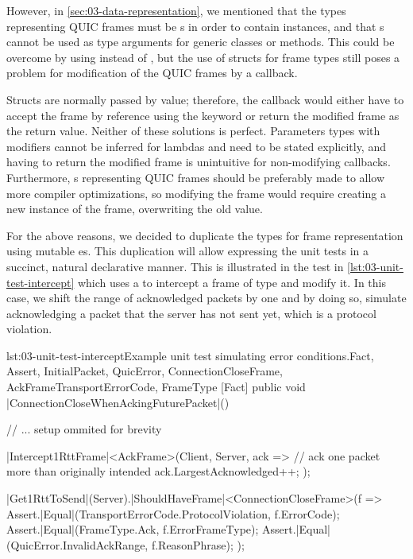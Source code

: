 However, in \autoref{sec:03-data-representation}, we mentioned that the types representing QUIC
frames must be s in order to contain  instances, and that
s cannot be used as type arguments for generic classes or methods. This could be
overcome by using  instead of , but the use of structs for frame
types still poses a problem for modification of the QUIC frames by a callback.

Structs are normally passed by value; therefore, the callback would either have to accept the frame
by reference using the  keyword or return the modified frame as the return value.
Neither of these solutions is perfect. Parameters types with  modifiers cannot be
inferred for lambdas and need to be stated explicitly, and having to return the modified frame is
unintuitive for non-modifying callbacks. Furthermore, s representing QUIC frames
should be preferably made  to allow more compiler optimizations, so modifying the
frame would require creating a new instance of the frame, overwriting the old value.

For the above reasons, we decided to duplicate the types for frame representation using mutable
es. This duplication will allow expressing the unit tests in a succinct, natural
declarative manner. This is illustrated in the test in \autoref{lst:03-unit-test-intercept} which
uses a  to intercept a frame of type  and
modify it. In this case, we shift the range of acknowledged packets by one and by doing so, simulate
acknowledging a packet that the server has not sent yet, which is a protocol violation.

\begin{myListingCsharp}{lst:03-unit-test-intercept}{Example unit test simulating error conditions.}{Fact, Assert, InitialPacket, QuicError, ConnectionCloseFrame, AckFrame}{TransportErrorCode, FrameType}
    [Fact]
    public void |ConnectionCloseWhenAckingFuturePacket|()
    {
        // ... setup ommited for brevity

        |Intercept1RttFrame|<AckFrame>(Client, Server, ack =>
        {
            // ack one packet more than originally intended
            ack.LargestAcknowledged++;
        });

        |Get1RttToSend|(Server).|ShouldHaveFrame|<ConnectionCloseFrame>(f =>
        {
            Assert.|Equal|(TransportErrorCode.ProtocolViolation, f.ErrorCode);
            Assert.|Equal|(FrameType.Ack, f.ErrorFrameType);
            Assert.|Equal|(QuicError.InvalidAckRange, f.ReasonPhrase);
        });
    }
\end{myListingCsharp}

